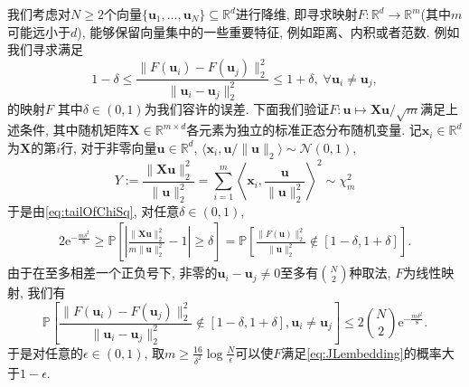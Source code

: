 \begin{example}
	我们考虑对$N \geq 2$个向量$\{\bm u_1, \dots, \bm u_N\} \subseteq \mathbb{R}^d$进行降维, 即寻求映射$F \colon \mathbb{R}^d \to \mathbb{R}^m$(其中$m$可能远小于$d$), 能够保留向量集中的一些重要特征, 例如距离、内积或者范数. 
	例如我们寻求满足
	\begin{equation}\label{eq:JLembedding}
		1 - \delta \leq \frac{\|F(\bm u_i) - F(\bm u_j)\|_2^2}{\|\bm u_i - \bm u_j\|_2^2} \leq 1 + \delta,\; \forall \bm u_i \neq \bm u_j, 
	\end{equation}的映射$F$
	其中$\delta \in (0,1)$为我们容许的误差. 
	下面我们验证$F \colon \bm{u} \mapsto \bm{X}\bm{u} / \sqrt{m}$满足上述条件, 其中随机矩阵$\bm X \in \mathbb{R}^{m \times d}$各元素为独立的标准正态分布随机变量. 
	记$\bm{x}_i \in \mathbb{R}^d$为$\bm{X}$的第$i$行, 对于非零向量$\bm{u} \in \mathbb{R}^d$, $\langle \bm{x}_i, \bm{u} / \|\bm{u}\|_2 \rangle \sim \mathcal{N}(0,1)$, 
	\begin{equation*}
		Y 
		:= \frac{\|\bm{X} \bm{u}\|_2^2}{\|\bm{u}\|_2^2}
		= \sum_{i=1}^m \left\langle \bm{x}_i, \frac{\bm{u}}{\|\bm{u}\|_2^2} \right\rangle^2
		\sim \chi^2_m
	\end{equation*}
	于是由\eqref{eq:tailOfChiSq}, 对任意$\delta \in (0,1)$, 
	\begin{align*}
		2 \mathrm{e}^{- \frac{m \delta^2}{8}}
		\geq \mathbb{P} \left[ \left| \frac{\|\bm{X} \bm{u}\|_2^2}{m \|\bm{u}\|_2^2} - 1 \right| \geq \delta \right]
		=  \mathbb{P} \left[ \frac{\|F(\bm{u})\|_2^2}{\|\bm{u}\|_2^2} \notin [1-\delta,1+\delta] \right]. 
	\end{align*}
	由于在至多相差一个正负号下, 非零的$\bm{u}_i - \bm{u}_j \neq 0$至多有$\binom{N}{2}$种取法, $F$为线性映射, 我们有
	\begin{equation*}
		\mathbb{P} \left[ \frac{\|F(\bm u_i) - F(\bm u_j)\|_2^2}{\|\bm u_i - \bm u_j\|_2^2} \notin [1-\delta,1+\delta], \bm{u}_i \neq \bm{u}_j \right]
		\leq 2 \binom{N}{2} \mathrm{e}^{- \frac{m \delta^2}{8}}. 
	\end{equation*}
	于是对任意的$\epsilon \in (0,1)$, 取$m \geq \frac{16}{\delta^2} \log \frac{N}{\epsilon}$可以使$F$满足\eqref{eq:JLembedding}的概率大于$1 - \epsilon$. 
\end{example}

